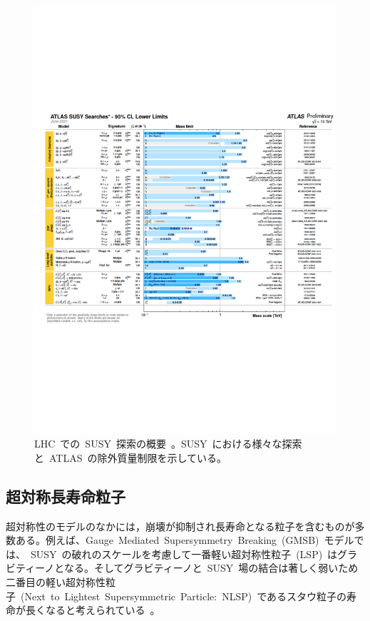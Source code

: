 \begin{figure}[H]
        \centering   
        \includegraphics[width=\textwidth,page=1]{img/pdf/susy1.pdf}
        \caption[LHC~での~SUSY~探索の概要]{LHC~での~SUSY~探索の概要~\cite{AR:13e}。SUSY~における様々な探索と~ATLAS~の除外質量制限を示している。}\label{fig:susy1}
\end{figure}


\subsection{超対称長寿命粒子}
\label{subsec:LSP}
超対称性のモデルのなかには，崩壊が抑制され長寿命となる粒子を含むものが多数ある。例えば、Gauge~Mediated~Supersymmetry~Breaking~(GMSB)~モデルでは、~SUSY~の破れのスケールを考慮して一番軽い超対称性粒子~(LSP)~はグラビティーノとなる。そしてグラビティーノと~SUSY~場の結合は著しく弱いため二番目の軽い超対称性粒子~(Next~to~Lightest~Supersymmetric~Particle:~NLSP)~であるスタウ粒子の寿命が長くなると考えられている~\cite{AR:12d,AR:12e}。

